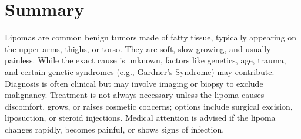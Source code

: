 
\section*{Summary}
Lipomas are common benign tumors made of fatty tissue, typically appearing on the upper arms, thighs, or torso. They are soft, slow-growing, and usually painless. While the exact cause is unknown, factors like genetics, age, trauma, and certain genetic syndromes (e.g., Gardner’s Syndrome) may contribute. Diagnosis is often clinical but may involve imaging or biopsy to exclude malignancy. Treatment is not always necessary unless the lipoma causes discomfort, grows, or raises cosmetic concerns; options include surgical excision, liposuction, or steroid injections. Medical attention is advised if the lipoma changes rapidly, becomes painful, or shows signs of infection.



